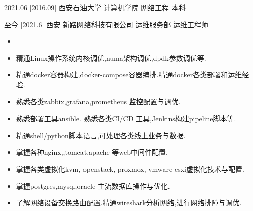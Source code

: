 \documentclass[zh]{resume}
\begin{document}
\begin{educations}
  \education%
    {2021.06}%
    [2016.09]%
    {西安石油大学}%
    {计算机学院}%
    {网络工程}%
    {本科}
\end{educations}
\begin{educations}
  \education%
    {至今}%
    [2021.6]%
    {西安}%
    {新路网络科技有限公司}%
    {运维服务部}%
    {运维工程师}
\end{educations}
\begin{itemize}
  \item {}
\end{itemize}
\begin{itemize}
  \item 精通Linux操作系统内核调优,numa架构调优,dpdk参数调优等.
  \item 精通docker容器构建,docker-compose容器编排.精通docker各类部署和运维经验.
  \item 熟悉各类zabbix,grafana,prometheus 监控配置与调优.
  \item 熟悉部署工具ansible. 熟悉各类CI/CD 工具,Jenkins构建pipeline脚本等.
  \item 精通shell/python脚本语言,可处理各类线上业务与数据.
  \item 掌握各种nginx,,tomcat,apache 等web中间件配置.
  \item 掌握各类虚拟化kvm, openstack, proxmox, vmware esxi虚拟化技术与配置.
  \item 掌握postgres,mysql,oracle 主流数据库操作与优化.
  \item 了解网络设备交换路由配置.精通wireshark分析网络,进行网络排障与调优.
\end{itemize}
\end{document}
